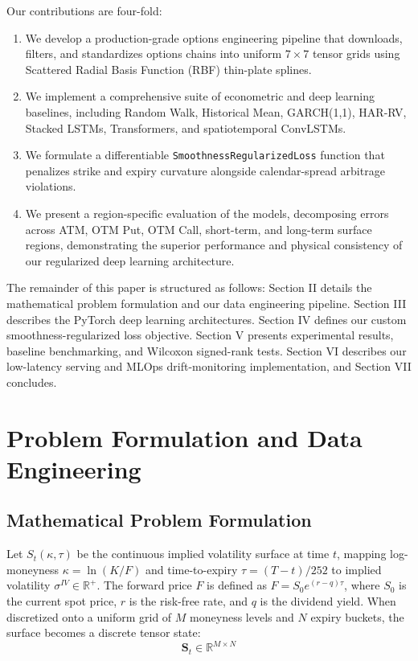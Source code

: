 \documentclass[conference]{IEEEtran}
\begin{document}
Our contributions are four-fold:
\begin{enumerate}
    \item We develop a production-grade options engineering pipeline that downloads, filters, and standardizes options chains into uniform $7 \times 7$ tensor grids using Scattered Radial Basis Function (RBF) thin-plate splines.
    \item We implement a comprehensive suite of econometric and deep learning baselines, including Random Walk, Historical Mean, GARCH(1,1), HAR-RV, Stacked LSTMs, Transformers, and spatiotemporal ConvLSTMs.
    \item We formulate a differentiable \texttt{SmoothnessRegularizedLoss} function that penalizes strike and expiry curvature alongside calendar-spread arbitrage violations.
    \item We present a region-specific evaluation of the models, decomposing errors across ATM, OTM Put, OTM Call, short-term, and long-term surface regions, demonstrating the superior performance and physical consistency of our regularized deep learning architecture.
\end{enumerate}

The remainder of this paper is structured as follows: Section II details the mathematical problem formulation and our data engineering pipeline. Section III describes the PyTorch deep learning architectures. Section IV defines our custom smoothness-regularized loss objective. Section V presents experimental results, baseline benchmarking, and Wilcoxon signed-rank tests. Section VI describes our low-latency serving and MLOps drift-monitoring implementation, and Section VII concludes.

\section{Problem Formulation and Data Engineering}

\subsection{Mathematical Problem Formulation}

Let $S_t(\kappa, \tau)$ be the continuous implied volatility surface at time $t$, mapping log-moneyness $\kappa = \ln(K/F)$ and time-to-expiry $\tau = (T-t)/252$ to implied volatility $\sigma^{IV} \in \mathbb{R}^+$. The forward price $F$ is defined as $F = S_0 e^{(r-q)\tau}$, where $S_0$ is the current spot price, $r$ is the risk-free rate, and $q$ is the dividend yield. When discretized onto a uniform grid of $M$ moneyness levels and $N$ expiry buckets, the surface becomes a discrete tensor state:
\begin{equation}
\mathbf{S}_t \in \mathbb{R}^{M \times N}
\end{equation}
\end{document}
